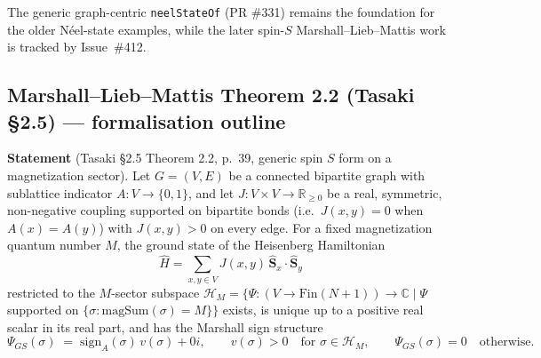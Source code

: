 \documentclass[a4paper,11pt]{article}
\begin{document}
The generic graph-centric \texttt{neelStateOf} (PR \#331) remains the
foundation for the older Néel-state examples, while the later spin-$S$
Marshall--Lieb--Mattis work is tracked by Issue~\#412.

\subsection*{Marshall--Lieb--Mattis Theorem 2.2 (Tasaki §2.5)
              — formalisation outline}
\label{subsec:mlm-spin-s-formalisation}

\textbf{Statement} (Tasaki §2.5 Theorem 2.2, p.~39, generic spin $S$
form on a magnetization sector). Let $G = (V, E)$ be a connected
bipartite graph with sublattice indicator $A: V \to \{0,1\}$, and
let $J: V \times V \to \mathbb{R}_{\ge 0}$ be a real, symmetric,
non-negative coupling supported on bipartite bonds (i.e.\
$J(x,y) = 0$ when $A(x) = A(y)$) with $J(x,y) > 0$ on every edge.
For a fixed magnetization quantum number $M$, the ground state of
the Heisenberg Hamiltonian
\[
  \hat H = \sum_{x,y \in V} J(x,y)\,\hat{\boldsymbol S}_x \cdot
  \hat{\boldsymbol S}_y
\]
restricted to the $M$-sector subspace
$\mathcal H_M = \{\Psi : (V \to \mathrm{Fin}(N+1)) \to \mathbb C \mid
  \Psi$ supported on $\{\sigma : \mathrm{magSum}(\sigma) = M\}\}$
exists, is unique up to a positive real scalar in its real part, and
has the Marshall sign structure
\[
  \Psi_{GS}(\sigma)
  \;=\;
  \mathrm{sign}_A(\sigma)\,v(\sigma) + 0i,
  \qquad v(\sigma) > 0 \quad \text{for } \sigma \in \mathcal H_M,
  \qquad \Psi_{GS}(\sigma) = 0 \quad \text{otherwise}.
\]
\end{document}
